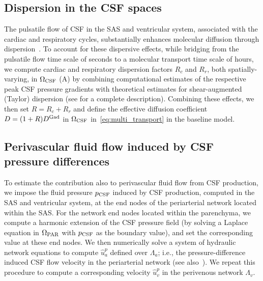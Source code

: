 \documentclass[fleqn,10pt]{wlscirep}
\begin{document}
\subsection*{Dispersion in the CSF spaces}

The pulsatile flow of CSF in the SAS and ventricular system,
associated with the cardiac and respiratory cycles, substantially
enhances molecular diffusion through
dispersion~\cite{taylor1953dispersion, watson1983diffusion,
  asgari2016glymphatic, sharp2019dispersion, ray2021quantitative,
  troyetsky2021dispersion}. To account for these dispersive effects,
while bridging from the pulsatile flow time scale of seconds to a
molecular transport time scale of hours, we compute cardiac and
respiratory dispersion factors $R_c$ and $R_r$, both
spatially-varying, in $\Omega_{\rm CSF}$ (A) by
combining computational estimates of the respective peak CSF pressure
gradients with theoretical estimates for shear-augmented (Taylor)
dispersion \cite{taylor1953dispersion, watson1983diffusion,
  sharp2019dispersion} (see  for a complete
description). Combining these effects, we then set $R = R_c + R_r$ and
define the effective diffusion coefficient $D = (1 + R) D^{\rm Gad}$
in $\Omega_{\rm CSF}$ in~\eqref{eq:multi_transport} in the baseline model.

\subsection*{Perivascular fluid flow induced by CSF pressure differences}

To estimate the contribution also to perivascular fluid flow from CSF
production, we impose the fluid pressure $p_{\rm CSF}$ induced by CSF
production, computed in the SAS and ventricular system, at the end
nodes of the periarterial network located within the SAS. For the
network end nodes located within the parenchyma, we compute a harmonic
extension of the CSF pressure field (by solving a Laplace equation in
$\Omega_{\rm PAR}$ with $p_{\rm CSF}$ as the boundary value), and set
the corresponding value at these end nodes. We then numerically solve
a system of hydraulic network equations to compute $\hat{u}^p_a$
defined over $\Lambda_a$; i.e., the pressure-difference induced CSF
flow velocity in the periarterial network (see
also~). We repeat this procedure to
compute a corresponding velocity $\hat{u}^p_v$ in the perivenous
network $\Lambda_v$.
\end{document}
